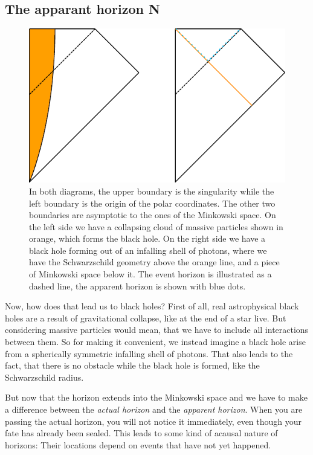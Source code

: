 \subsection{The apparant horizon N}
	\begin{figure}[tbp] 
		\begin{center}
			\includegraphics[scale=1]{collapse}
		\end{center}
			\caption{In both diagrams, the upper boundary is the singularity while the left boundary is the origin of the polar coordinates. The other two boundaries are asymptotic to the ones of the Minkowski space. On the left side we have a collapsing cloud of massive particles shown in orange, which forms the black hole. On the right side we have a black hole forming out of an infalling shell of photons, where we have the Schwarzschild geometry above the orange line, and a piece of Minkowski space below it. The event horizon is illustrated as a dashed line, the apparent horizon is shown with blue dots.}\label{collapse}
	\end{figure}	
	Now, how does that lead us to black holes? First of all, real astrophysical black holes are a result of gravitational collapse, like at the end of a star live. But considering massive particles would mean, that we have to include all interactions between them. So for making it convenient, we instead imagine a black hole arise from a spherically symmetric infalling shell of photons. 
	That also leads to the fact, that there is no obstacle while the black hole is formed, like the Schwarzschild radius.
		
	But now that the horizon extends into the Minkowski space and we have to make a difference between the \textit{actual horizon} and the \textit{apparent horizon}.
	When you are passing the actual horizon, you will not notice it immediately, even though your fate has already been sealed. This leads to some kind of acausal nature of horizons: Their locations depend on events that have not yet happened. 
	
